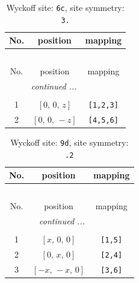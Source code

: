 \documentclass[fleqn,8pt]{jsarticle}
\begin{document}
\begin{longtable}{ccc}
\caption{Wyckoff site: {\tt 6c}, site symmetry: {\tt 3.}}
 \\
 \hline \hline
No. & position & mapping \\ \hline \endfirsthead

\multicolumn{2}{l}{\tablename\ \thetable{}} \\
 \hline \hline
No. & position & mapping \\ \hline \endhead

 \hline \hline
\multicolumn{2}{r}{\footnotesize\it continued ...} \\ \endfoot

 \hline \hline
\multicolumn{2}{r}{} \\ \endlastfoot

1 & $\left[ 0,\, 0,\, z \right]$ & {\tt [1,2,3]} \\ \hline
2 & $\left[ 0,\, 0,\, - z \right]$ & {\tt [4,5,6]} \\
\end{longtable}
\renewcommand{\arraystretch}{1.2}
\begin{longtable}{ccc}
\caption{Wyckoff site: {\tt 9d}, site symmetry: {\tt .2}}
 \\
 \hline \hline
No. & position & mapping \\ \hline \endfirsthead

\multicolumn{2}{l}{\tablename\ \thetable{}} \\
 \hline \hline
No. & position & mapping \\ \hline \endhead

 \hline \hline
\multicolumn{2}{r}{\footnotesize\it continued ...} \\ \endfoot

 \hline \hline
\multicolumn{2}{r}{} \\ \endlastfoot

1 & $\left[ x,\, 0,\, 0 \right]$ & {\tt [1,5]} \\ \hline
2 & $\left[ 0,\, x,\, 0 \right]$ & {\tt [2,4]} \\ \hline
3 & $\left[ - x,\, - x,\, 0 \right]$ & {\tt [3,6]} \\
\end{longtable}
\renewcommand{\arraystretch}{1.2}
\end{document}
